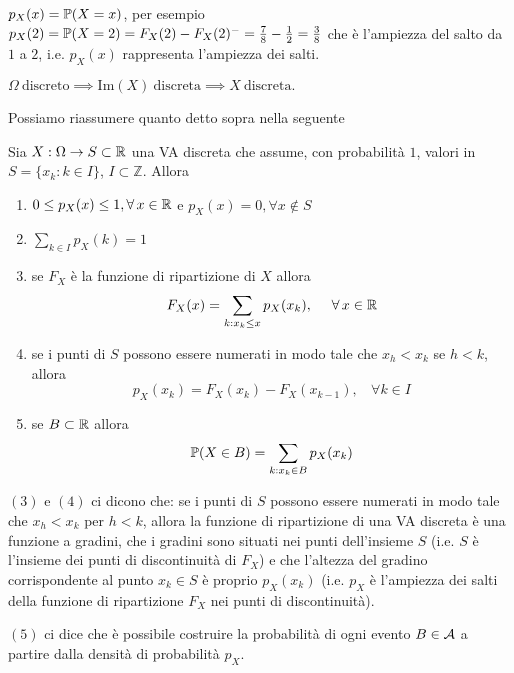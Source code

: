$p_{X}(x) =\mathbb{P}(X=x)$, per esempio $p_{X}(2) =\mathbb{P}(X=2) =F_{X}(2) -F_{X}(2)^{-} =\frac{7}{8} -\frac{1}{2} =\frac{3}{8}$ che è l'ampiezza del salto da $1$ a $2$, i.e. $p_{X}(x)$ rappresenta l'ampiezza dei salti.
\begin{rem}
$\Omega \ \text{discreto} \implies \mathrm{Im}(X) \ \text{discreta} \implies X\ \text{discreta} .$
\end{rem}
Possiamo riassumere quanto detto sopra nella seguente
\begin{thm}
Sia $X:\Omega \rightarrow S\subset \mathbb{R}$ una VA discreta che assume, con probabilità $1$, valori in $S=\{x_{k} :k\in I\}$, $I\subset \mathbb{Z}$. Allora
\end{thm}
\begin{enumerate}
\item $0\leq p_{X}(x) \leq 1,\forall x\in \RR$ e $p_{X}(x) =0,\forall x\notin S$
\item $\sum\limits_{k\in I} p_{X}(k) =1$
\item se $F_{X}$ è la funzione di ripartizione di $X$ allora
\begin{equation*}
F_{X}(x) =\sum\limits_{k:x_{k} \leq x} p_{X}(x_{k}) ,\ \ \ \ \forall x\in \RR
\end{equation*}
\item se i punti di $S$ possono essere numerati in modo tale che $x_{h} < x_{k}$ se $h< k$, allora
\begin{equation*}
p_{X}(x_{k}) =F_{X}(x_{k}) -F_{X}(x_{k-1}) ,\ \ \ \ \forall k\in I
\end{equation*}
\item se $B\subset \mathbb{R}$ allora
\begin{equation*}
\mathbb{P}(X\in B) =\sum\limits_{k:x_{k} \in B} p_{X}(x_{k})
\end{equation*}
\end{enumerate}
\begin{rem}
$(3)$ e $(4)$ ci dicono che: se i punti di $S$ possono essere numerati in modo tale che $x_{h} < x_{k}$ per $h< k$, allora la funzione di ripartizione di una VA discreta è una funzione a gradini, che i gradini sono situati nei punti dell'insieme $S$ (i.e. $S$ è l'insieme dei punti di discontinuità di $F_{X}$) e che l'altezza del gradino corrispondente al punto $x_{k} \in S$ è proprio $p_{X}(x_{k})$ (i.e. $p_{X}$ è l'ampiezza dei salti della funzione di ripartizione $F_{X}$ nei punti di discontinuità).

$(5)$ ci dice che è possibile costruire la probabilità di ogni evento $B\in \mathcal{A}$ a partire dalla densità di probabilità $p_{X}$.
\end{rem}

